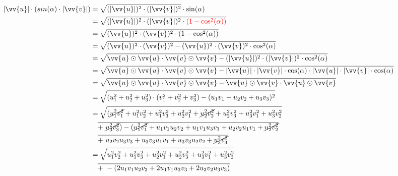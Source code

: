     \begin{Beweis}
        \begin{align*}
            |\vv{u}| \cdot (sin(\alpha) \cdot |\vv{v}|) &= \sqrt{(|\vv{u}|)^2 \cdot (|\vv{v}|)^2} \cdot \sin(\alpha) \\
                                                        &= \sqrt{(|\vv{u}|)^2 \cdot (|\vv{v}|)^2 \cdot \textcolor{red}{(1 - \cos^2(\alpha))}} \\
                                                        &= \sqrt{(\vv{u})^2 \cdot (\vv{v})^2 \cdot (1 - \cos^2(\alpha))} \\
                                                        &= \sqrt{(\vv{u})^2 \cdot (\vv{v})^2 - (\vv{u})^2 \cdot (\vv{v})^2 \cdot \cos^2(\alpha)} \\
                                                        &= \sqrt{\vv{u} \odot \vv{u} \cdot \vv{v} \odot \vv{v} - (|\vv{u}|)^2 \cdot (|\vv{v}|)^2 \cdot \cos^2(\alpha)} \\
                                                        &= \sqrt{\vv{u} \odot \vv{u} \cdot \vv{v} \odot \vv{v} - |\vv{u}| \cdot |\vv{v}| \cdot \cos(\alpha) \cdot |\vv{u}| \cdot |\vv{v}| \cdot \cos(\alpha)} \\
                                                        &= \sqrt{\vv{u} \odot \vv{u} \cdot \vv{v} \odot \vv{v} - \vv{u} \odot \vv{v} \cdot \vv{u} \odot \vv{v}} \\
                                                        &= \sqrt{(u_1^2 + u_2^2 + u_3^2) \cdot (v_1^2 + v_2^2 + v_3^2) - (u_1v_1 + u_2v_2 + u_3v_3)^2} \\
                                                        &= \sqrt{(\cancel{u_1^2v_1^2} + u_1^2v_2^2 + u_1^2v_3^2 + u_2^2v_1^2 + \cancel{u_2^2v_2^2} + u_2^2v_3^2 + u_3^2v_1^2 + u_3^2v_2^2} \\
                                                        & \quad \overline{+\text{ }\cancel{u_3^2v_3^2}) - (\cancel{u_1^2v_1^2} + u_1v_1u_2v_2 + u_1v_1u_3v_3 + u_2v_2u_1v_1 + \cancel{u_2^2v_2^2}} \\
                                                        & \quad \overline{+\text{ }u_2v_2u_3v_3 + u_3v_3u_1v_1 + u_3v_3u_2v_2 + \cancel{u_3^2v_3^2}} \\
                                                        &= \sqrt{u_1^2v_2^2 + u_1^2v_3^2 + u_2^2v_1^2 + u_2^2v_3^2 + u_3^2v_1^2 + u_3^2v_2^2} \\
                                                        & \quad \overline{+\text{ } - (2u_1v_1u_2v_2 + 2u_1v_1u_3v_3 + 2u_2v_2u_3v_3)} \\

\end{align*}
\end{Beweis}
